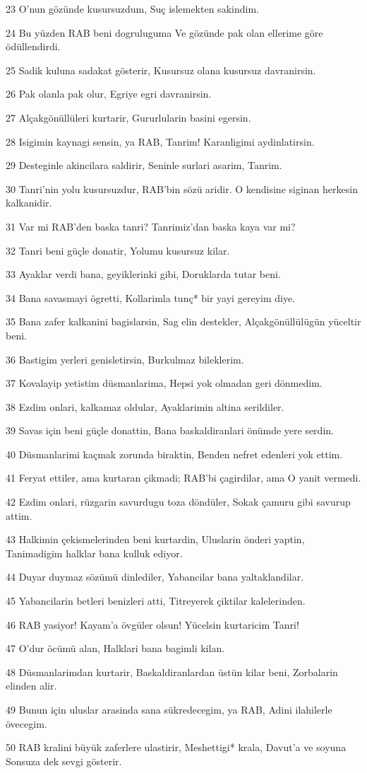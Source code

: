 \par 23 O'nun gözünde kusursuzdum, Suç islemekten sakindim.
\par 24 Bu yüzden RAB beni dogruluguma Ve gözünde pak olan ellerime göre ödüllendirdi.
\par 25 Sadik kuluna sadakat gösterir, Kusursuz olana kusursuz davranirsin.
\par 26 Pak olanla pak olur, Egriye egri davranirsin.
\par 27 Alçakgönüllüleri kurtarir, Gururlularin basini egersin.
\par 28 Isigimin kaynagi sensin, ya RAB, Tanrim! Karanligimi aydinlatirsin.
\par 29 Desteginle akincilara saldirir, Seninle surlari asarim, Tanrim.
\par 30 Tanri'nin yolu kusursuzdur, RAB'bin sözü aridir. O kendisine siginan herkesin kalkanidir.
\par 31 Var mi RAB'den baska tanri? Tanrimiz'dan baska kaya var mi?
\par 32 Tanri beni güçle donatir, Yolumu kusursuz kilar.
\par 33 Ayaklar verdi bana, geyiklerinki gibi, Doruklarda tutar beni.
\par 34 Bana savasmayi ögretti, Kollarimla tunç* bir yayi gereyim diye.
\par 35 Bana zafer kalkanini bagislarsin, Sag elin destekler, Alçakgönüllülügün yüceltir beni.
\par 36 Bastigim yerleri genisletirsin, Burkulmaz bileklerim.
\par 37 Kovalayip yetistim düsmanlarima, Hepsi yok olmadan geri dönmedim.
\par 38 Ezdim onlari, kalkamaz oldular, Ayaklarimin altina serildiler.
\par 39 Savas için beni güçle donattin, Bana baskaldiranlari önümde yere serdin.
\par 40 Düsmanlarimi kaçmak zorunda biraktin, Benden nefret edenleri yok ettim.
\par 41 Feryat ettiler, ama kurtaran çikmadi; RAB'bi çagirdilar, ama O yanit vermedi.
\par 42 Ezdim onlari, rüzgarin savurdugu toza döndüler, Sokak çamuru gibi savurup attim.
\par 43 Halkimin çekismelerinden beni kurtardin, Uluslarin önderi yaptin, Tanimadigim halklar bana kulluk ediyor.
\par 44 Duyar duymaz sözümü dinlediler, Yabancilar bana yaltaklandilar.
\par 45 Yabancilarin betleri benizleri atti, Titreyerek çiktilar kalelerinden.
\par 46 RAB yasiyor! Kayam'a övgüler olsun! Yücelsin kurtaricim Tanri!
\par 47 O'dur öcümü alan, Halklari bana bagimli kilan.
\par 48 Düsmanlarimdan kurtarir, Baskaldiranlardan üstün kilar beni, Zorbalarin elinden alir.
\par 49 Bunun için uluslar arasinda sana sükredecegim, ya RAB, Adini ilahilerle övecegim.
\par 50 RAB kralini büyük zaferlere ulastirir, Meshettigi* krala, Davut'a ve soyuna Sonsuza dek sevgi gösterir.

